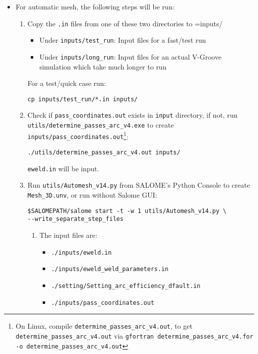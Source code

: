 \documentclass[12pt,letterpaper]{article}
\newcommand{\verbStyle}[1]{{\color{SteelBlue40}\colorbox{LightSteelBlue10}{{#1}}}}
\let\OldTexttt\texttt
\renewcommand{\texttt}[1]{\OldTexttt{\verbStyle{#1}}}
\begin{document}
\begin{itemize}
\item For automatic mesh, the following steps will be run:
\begin{enumerate}
\item Copy the \texttt{.in} files from one of these two directories to =inputs/
\begin{itemize}
\item Under \texttt{inputs/test\_run}: Input files for a fast/test run
\item Under \texttt{inputs/long\_run}: Input files for an actual V-Groove simulation which take much longer to run
\end{itemize}
For a test/quick case run: 
\begin{verbatim}
cp inputs/test_run/*.in inputs/
\end{verbatim}
\item Check if \texttt{pass\_coordinates.out} exists in \texttt{input} directory, if not, run \\
\texttt{utils/determine\_passes\_arc\_v4.exe} to create \texttt{inputs/pass\_coordinates.out}\footnote{On Linux, compile \texttt{determine\_passes\_arc\_v4.out}, to get \texttt{determine\_passes\_arc\_v4.out} via \texttt{gfortran determine\_passes\_arc\_v4.for -o determine\_passes\_arc\_v4.out}}:
\begin{verbatim}
./utils/determine_passes_arc_v4.out inputs/
\end{verbatim}
\texttt{eweld.in} will be input.
\item Run \texttt{utils/Automesh\_v14.py} from SALOME's Python Console to create \texttt{Mesh\_3D.unv}, or run 
without Salome GUI:
\begin{verbatim}
$SALOMEPATH/salome start -t -w 1 utils/Automesh_v14.py \
--write_separate_step_files
\end{verbatim}
\begin{enumerate}
\item The input files are:
\begin{itemize}
\item \texttt{./inputs/eweld.in}
\item \texttt{./inputs/eweld\_weld\_parameters.in}
\item \texttt{./setting/Setting\_arc\_efficiency\_dfault.in}
\item \texttt{./inputs/pass\_coordinates.out}
\end{itemize}


\end{enumerate}
\end{enumerate}
\end{itemize}
\end{document}

